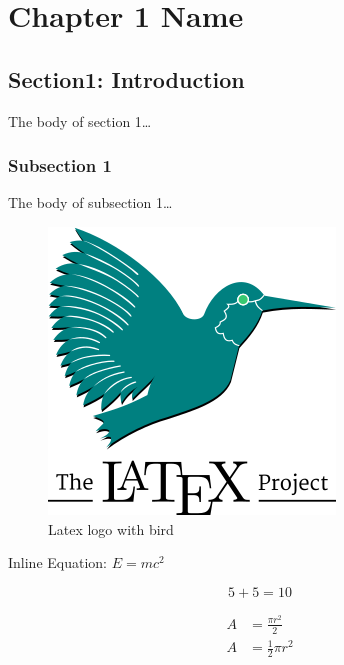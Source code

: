 \chapter{Chapter 1 Name}\label{ch1}


\section{Section1: Introduction}

The body of section 1\ldots

\subsection{Subsection 1}

The body of subsection 1\ldots

\begin{figure}[H]
    \centering
    \includegraphics{figures/latex.png}
    \caption{Latex logo with bird}\label{fig:latex_fig}
\end{figure}

Inline Equation: \(E=mc^2\)

\begin{equation}
    5+5=10
\end{equation}

\begin{equation}
    \begin{split}
        A & = \frac{\pi r^2}{2}   \\
        A & = \frac{1}{2} \pi r^2
    \end{split}
\end{equation}

